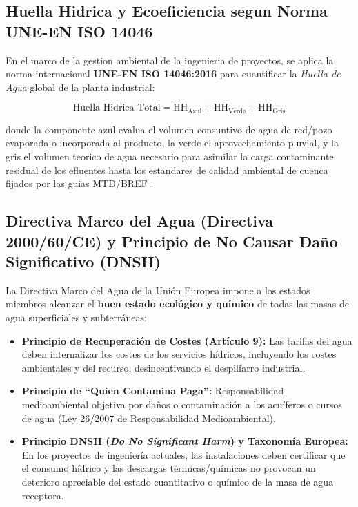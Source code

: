\documentclass{report}
\begin{document}
\subsection{Huella Hidrica y Ecoeficiencia segun Norma UNE-EN ISO 14046}

En el marco de la gestion ambiental de la ingenieria de proyectos, se aplica la norma internacional \textbf{UNE-EN ISO 14046:2016} \cite{ISO14046_2016} para cuantificar la \textit{Huella de Agua} global de la planta industrial:

\begin{equation}

    \text{Huella Hidrica Total} = \text{HH}_{\text{Azul}} + \text{HH}_{\text{Verde}} + \text{HH}_{\text{Gris}}

\end{equation}

donde la componente azul evalua el volumen consuntivo de agua de red/pozo evaporada o incorporada al producto, la verde el aprovechamiento pluvial, y la gris el volumen teorico de agua necesario para asimilar la carga contaminante residual de los efluentes hasta los estandares de calidad ambiental de cuenca fijados por las guias MTD/BREF \cite{CWW_BREF_2016}.





\subsection{Directiva Marco del Agua (Directiva 2000/60/CE) y Principio de No Causar Daño Significativo (DNSH)}

La Directiva Marco del Agua de la Unión Europea impone a los estados miembros alcanzar el \textbf{buen estado ecológico y químico} de todas las masas de agua superficiales y subterráneas:

\begin{itemize}

    \item \textbf{Principio de Recuperación de Costes (Artículo 9):} Las tarifas del agua deben internalizar los costes de los servicios hídricos, incluyendo los costes ambientales y del recurso, desincentivando el despilfarro industrial.

    \item \textbf{Principio de ``Quien Contamina Paga'':} Responsabilidad medioambiental objetiva por daños o contaminación a los acuíferos o cursos de agua (Ley 26/2007 de Responsabilidad Medioambiental).

    \item \textbf{Principio DNSH (\textit{Do No Significant Harm}) y Taxonomía Europea:} En los proyectos de ingeniería actuales, las instalaciones deben certificar que el consumo hídrico y las descargas térmicas/químicas no provocan un deterioro apreciable del estado cuantitativo o químico de la masa de agua receptora.

\end{itemize}
\end{document}
